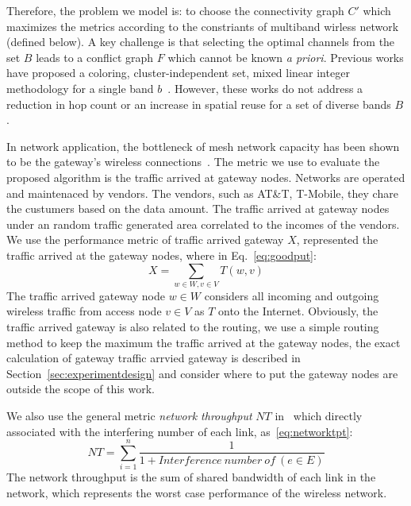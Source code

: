 Therefore, the problem we model is: to choose the connectivity graph $C'$ which maximizes
the metrics according to the constriants of multiband wirless network (defined below).
A key challenge is that selecting the optimal channels from
the set $B$ leads to a conflict graph $F$ which cannot be known {\it a priori}.
Previous works have proposed a coloring, cluster-independent set, mixed linear integer methodology
for a single band $b$~\cite{peng2012efficient,tang2005interference,doraghinejad2014channel}. 
However, these works do not address a reduction in hop count or an increase in spatial reuse for a set of 
diverse bands $B$. 

In network application, the bottleneck of mesh network capacity has been shown to be the gateway's wireless 
connections~\cite{robinson2008adding}.
The metric we use to evaluate the proposed algorithm is the traffic arrived at gateway nodes.
Networks are operated and maintenaced by vendors.
The vendors, such as AT\&T, T-Mobile, they chare the custumers based on the data amount. 
The traffic arrived at gateway nodes under an random traffic generated area 
correlated to the incomes of the vendors. We use the performance metric of 
traffic arrived gateway $X$, represented the traffic arrived at the gateway nodes, where in Eq.~\ref{eq:goodput}:
\begin{equation}
\label{eq:goodput}
X=\sum_{w \in W, v \in V}T(w,v)
\end{equation}
The traffic arrived gateway node $w\in W$ considers all incoming and outgoing wireless traffic 
from access node $v\in V$ as $T$ onto the Internet.
Obviously, the traffic arrived gateway is also related to the routing, we use a simple routing
method to keep the maximum the traffic arrived at the gateway nodes, the exact calculation 
of gateway traffic arrvied gateway is described in Section~\ref{sec:experimentdesign} 
and consider where to put the gateway nodes are outside the scope of this work.

We also use the general metric \emph{network throughput} $NT$
in~\cite{tang2005interference,doraghinejad2014channel} 
which directly associated with the interfering number of each link, as~\ref{eq:networktpt}:
\begin{equation}
\label{eq:networktpt}
NT = \sum_{i=1}^{n}\frac{1}{1+Interference\ number\ of\ (e \in E)}
\end{equation}
The network throughput is the sum of shared bandwidth of each link in the network, 
which represents the worst case performance of the wireless network.


